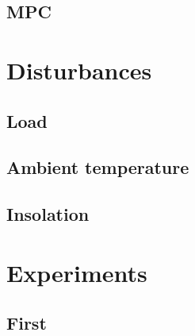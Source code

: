 

\subsection{MPC}



\section{Disturbances}

\subsection{Load}



\subsection{Ambient temperature}



\subsection{Insolation}



\section{Experiments}

\subsection{First}
\label{app:code:experiments:first}


